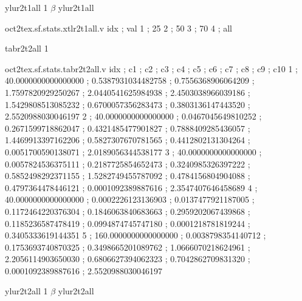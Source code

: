 \expandafter\def\csname oct2tex.sf.stats.ylur2t1all.t\endcsname{ylur2t1all}
\expandafter\def\csname oct2tex.sf.stats.ylur2t1all.u\endcsname{1}
\expandafter\def\csname oct2tex.sf.stats.ylur2t1all.v\endcsname{$\beta$}
\expandafter\def\csname oct2tex.sf.stats.xtlr2t1all.t\endcsname{ylur2t1all}
\begin{filecontents}[overwrite]{oct2tex.sf.stats.xtlr2t1all.v}
idx ; val
1 ; 25
2 ; 50
3 ; 70
4 ; all
\end{filecontents}
\expandafter\def\csname oct2tex.sf.stats.tabr2t2all.t\endcsname{tabr2t2all}
\expandafter\def\csname oct2tex.sf.stats.tabr2t2all.u\endcsname{1}
\begin{filecontents}[overwrite]{oct2tex.sf.stats.tabr2t2all.v}
idx ; c1 ; c2 ; c3 ; c4 ; c5 ; c6 ; c7 ; c8 ; c9 ; c10
1 ; 40.0000000000000000 ; 0.5387931034482758 ; 0.7556368906064209 ; 1.7597820929250267 ; 2.0440541625984938 ; 2.4503038966039186 ; 1.5429808513085232 ; 0.6700057356283473 ; 0.3803136147443520 ; 2.5520988030046197
2 ; 40.0000000000000000 ; 0.0467045649810252 ; 0.2671599718862047 ; 0.4321485477901827 ; 0.7888409285436057 ; 1.4469913397162206 ; 0.5827307670781565 ; 0.4412802131304264 ; 0.0051700590138071 ; 2.0189056344538177
3 ; 40.0000000000000000 ; 0.0057824536375111 ; 0.2187725854652473 ; 0.3240985326397222 ; 0.5852498292371155 ; 1.5282749455787092 ; 0.4784156804904088 ; 0.4797364478446121 ; 0.0001092389887616 ; 2.3547407646458689
4 ; 40.0000000000000000 ; 0.0002226123136903 ; 0.0137477921187005 ; 0.1172464220376304 ; 0.1846063840683663 ; 0.2959202067439868 ; 0.1185236587478419 ; 0.0994874745747180 ; 0.0001218781819244 ; 0.3405333619144351
5 ; 160.0000000000000000 ; 0.0038798354140712 ; 0.1753693740870325 ; 0.3498665201089762 ; 1.0666070218624961 ; 2.2056114903650030 ; 0.6806627394062323 ; 0.7042862709831320 ; 0.0001092389887616 ; 2.5520988030046197
\end{filecontents}
\expandafter\def\csname oct2tex.sf.stats.ylur2t2all.t\endcsname{ylur2t2all}
\expandafter\def\csname oct2tex.sf.stats.ylur2t2all.u\endcsname{1}
\expandafter\def\csname oct2tex.sf.stats.ylur2t2all.v\endcsname{$\beta$}
\expandafter\def\csname oct2tex.sf.stats.xtlr2t2all.t\endcsname{ylur2t2all}

